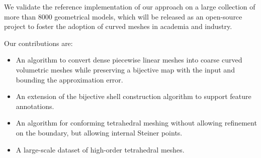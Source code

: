 We validate the reference implementation of our approach on a large collection of more than 8000 geometrical models, which will be released as an open-source project to foster the adoption of curved meshes in academia and industry.

Our contributions are:
\begin{itemize}
    \item An algorithm to convert dense piecewise linear meshes into coarse curved volumetric meshes while preserving a bijective map with the input and bounding the approximation error.
    \item An extension of the bijective shell construction algorithm to support feature {annotations}.
    \item An algorithm for conforming tetrahedral meshing without allowing refinement on the boundary, but allowing internal Steiner points.
    \item A large-scale dataset of high-order tetrahedral meshes.
\end{itemize}